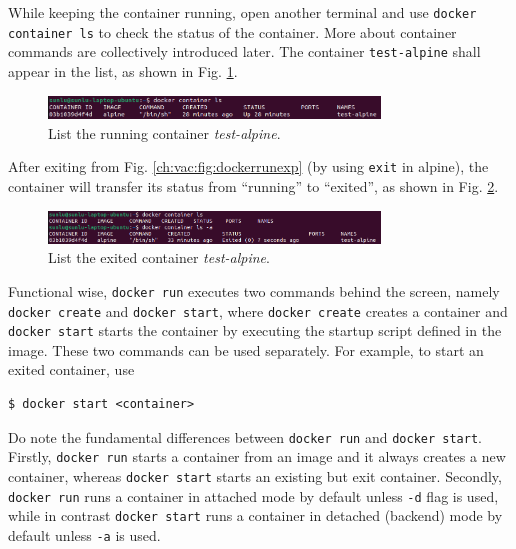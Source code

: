 While keeping the container running, open another terminal and use \verb|docker container ls| to check the status of the container. More about container commands are collectively introduced later. The container \verb|test-alpine| shall appear in the list, as shown in Fig. \ref{ch:vac:fig:dockerrunexppart2}.
\begin{figure}[!htb]
	\centering
	\includegraphics[width=250pt]{chapters/part-3/figures/dockerrunexppart2.png}
	\caption{List the running container \textit{test-alpine}.} \label{ch:vac:fig:dockerrunexppart2}
\end{figure}
After exiting from Fig. \ref{ch:vac:fig:dockerrunexp} (by using \verb|exit| in alpine), the container will transfer its status from ``running'' to ``exited'', as shown in Fig. \ref{ch:vac:fig:dockerrunexppart3}.
\begin{figure}[!htb]
	\centering
	\includegraphics[width=250pt]{chapters/part-3/figures/dockerrunexppart3.png}
	\caption{List the exited container \textit{test-alpine}.} \label{ch:vac:fig:dockerrunexppart3}
\end{figure}

Functional wise, \verb|docker run| executes two commands behind the screen, namely \verb|docker create| and \verb|docker start|, where \verb|docker create| creates a container and \verb|docker start| starts the container by executing the startup script defined in the image. These two commands can be used separately. For example, to start an exited container, use
\begin{lstlisting}
$ docker start <container>
\end{lstlisting}

\begin{shortbox}

Do note the fundamental differences between \verb|docker run| and \verb|docker start|. Firstly, \verb|docker run| starts a container from an image and it always creates a new container, whereas \verb|docker start| starts an existing but exit container. Secondly, \verb|docker run| runs a container in attached mode by default unless \verb|-d| flag is used, while in contrast \verb|docker start| runs a container in detached (backend) mode by default unless \verb|-a| is used. 
\end{shortbox}

